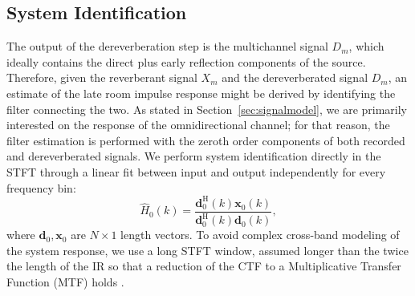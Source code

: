 \subsection{System Identification}


The output of the dereverberation step is the multichannel signal $D_m$, which ideally contains the direct plus early reflection components of the source. Therefore, given the reverberant signal $X_m$ and the dereverberated signal $D_m$, an estimate of the late room impulse response might be derived by identifying the filter connecting the two. 
As stated in Section~\ref{sec:signalmodel}, we are primarily interested on the response of the omnidirectional channel; for that reason, the filter estimation is performed with the zeroth order components of both recorded  and dereverberated signals. We perform system identification directly in the STFT through a linear fit between input and output independently for every frequency bin:
\begin{equation}
   \hat{H}_0(k) = \frac{\mathbf{d}^{\mathrm{H}}_0(k) \mathbf{x}^{}_0(k) } {\mathbf{d}^{\mathrm{H}}_0(k) \mathbf{d}^{}_0(k)},
\end{equation}
where $\mathbf{d}_0, \mathbf{x}_0$ are $N\times 1$ length vectors. To avoid complex cross-band modeling of the system response, we use a long STFT window, assumed longer than the twice the length of the IR so that a reduction of the CTF to a Multiplicative Transfer Function (MTF) holds \cite{avargel2007multiplicative}.

